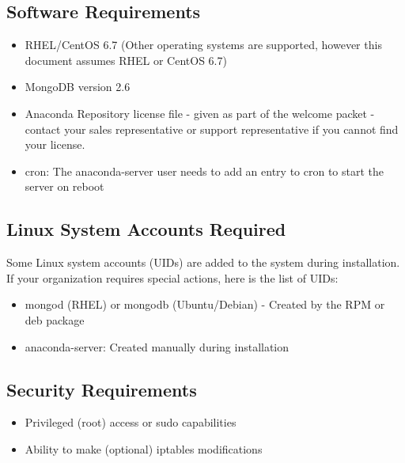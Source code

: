 \documentclass[letterpaper,10pt,openany,oneside]{sphinxmanual}
\begin{document}
\subsection{Software Requirements}
\label{AnacondaRepository:software-requirements}\begin{itemize}
\item {} 
RHEL/CentOS 6.7 (Other operating systems are supported, however this
document assumes RHEL or CentOS 6.7)

\item {} 
MongoDB version 2.6

\item {} 
Anaconda Repository license file - given as part of the welcome packet -
contact your sales representative or support representative if you
cannot find your license.

\item {} 
cron: The anaconda-server user needs to add an entry to cron to start the server on reboot

\end{itemize}


\subsection{Linux System Accounts Required}
\label{AnacondaRepository:linux-system-accounts-required}
Some Linux system accounts (UIDs) are added to the system during installation.
If your organization requires special actions, here is the list of UIDs:
\begin{itemize}
\item {} 
mongod (RHEL) or mongodb (Ubuntu/Debian) - Created by the RPM or deb package

\item {} 
anaconda-server: Created manually during installation

\end{itemize}


\subsection{Security Requirements}
\label{AnacondaRepository:security-requirements}\begin{itemize}
\item {} 
Privileged (root) access or sudo capabilities

\item {} 
Ability to make (optional) iptables modifications

\end{itemize}
\end{document}
